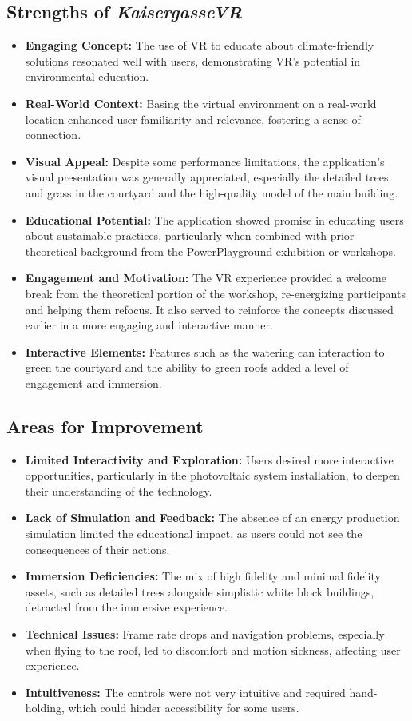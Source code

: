 \documentclass[draft, final]{vutinfth} %
\begin{document}
\subsection{Strengths of \textit{KaisergasseVR}}
\begin{itemize}
    \item \textbf{Engaging Concept:} The use of VR to educate about climate-friendly solutions resonated well with users, demonstrating VR's potential in environmental education.
    \item \textbf{Real-World Context:} Basing the virtual environment on a real-world location enhanced user familiarity and relevance, fostering a sense of connection.
    \item \textbf{Visual Appeal:} Despite some performance limitations, the application's visual presentation was generally appreciated, especially the detailed trees and grass in the courtyard and the high-quality model of the main building.
    \item \textbf{Educational Potential:} The application showed promise in educating users about sustainable practices, particularly when combined with prior theoretical background from the PowerPlayground exhibition or workshops.
    \item \textbf{Engagement and Motivation:} The VR experience provided a welcome break from the theoretical portion of the workshop, re-energizing participants and helping them refocus. It also served to reinforce the concepts discussed earlier in a more engaging and interactive manner.
    \item \textbf{Interactive Elements:} Features such as the watering can interaction to green the courtyard and the ability to green roofs added a level of engagement and immersion.
\end{itemize}

\subsection{Areas for Improvement}
\begin{itemize}
    \item \textbf{Limited Interactivity and Exploration:} Users desired more interactive opportunities, particularly in the photovoltaic system installation, to deepen their understanding of the technology.
    \item \textbf{Lack of Simulation and Feedback:} The absence of an energy production simulation limited the educational impact, as users could not see the consequences of their actions.
    \item \textbf{Immersion Deficiencies:} The mix of high fidelity and minimal fidelity assets, such as detailed trees alongside simplistic white block buildings, detracted from the immersive experience.
    \item \textbf{Technical Issues:} Frame rate drops and navigation problems, especially when flying to the roof, led to discomfort and motion sickness, affecting user experience.
    \item \textbf{Intuitiveness:} The controls were not very intuitive and required hand-holding, which could hinder accessibility for some users.
\end{itemize}
\end{document}
